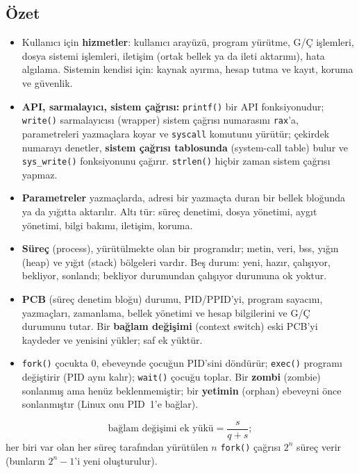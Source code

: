 \documentclass[11pt,a4paper]{article}
\newcommand{\term}[1]{\textbf{\color{mintdeep}#1}}
\newcommand{\cmd}[1]{\texttt{#1}}
\begin{document}
\subsection*{Özet}
\begin{itemize}
  \item Kullanıcı için \textbf{hizmetler}: kullanıcı arayüzü, program yürütme, G/Ç işlemleri, dosya sistemi işlemleri, iletişim (ortak bellek ya da ileti aktarımı), hata algılama. Sistemin kendisi için: kaynak ayırma, hesap tutma ve kayıt, koruma ve güvenlik.
  \item \textbf{API, sarmalayıcı, sistem çağrısı:} \cmd{printf()} bir API fonksiyonudur; \cmd{write()} sarmalayıcısı (wrapper) sistem çağrısı numarasını \texttt{rax}'a, parametreleri yazmaçlara koyar ve \texttt{syscall} komutunu yürütür; çekirdek numarayı denetler, \term{sistem çağrısı tablosunda} (system-call table) bulur ve \cmd{sys\_write()} fonksiyonunu çağırır. \cmd{strlen()} hiçbir zaman sistem çağrısı yapmaz.
  \item \textbf{Parametreler} yazmaçlarda, adresi bir yazmaçta duran bir bellek bloğunda ya da yığıtta aktarılır. Altı tür: süreç denetimi, dosya yönetimi, aygıt yönetimi, bilgi bakımı, iletişim, koruma.
  \item \term{Süreç} (process), yürütülmekte olan bir programdır; metin, veri, bss, yığın (heap) ve yığıt (stack) bölgeleri vardır. Beş durum: yeni, hazır, çalışıyor, bekliyor, sonlandı; bekliyor durumundan çalışıyor durumuna ok yoktur.
  \item \term{PCB} (süreç denetim bloğu) durumu, PID/PPID'yi, program sayacını, yazmaçları, zamanlama, bellek yönetimi ve hesap bilgilerini ve G/Ç durumunu tutar. Bir \term{bağlam değişimi} (context switch) eski PCB'yi kaydeder ve yenisini yükler; saf ek yüktür.
  \item \cmd{fork()} çocukta $0$, ebeveynde çocuğun PID'sini döndürür; \cmd{exec()} programı değiştirir (PID aynı kalır); \cmd{wait()} çocuğu toplar. Bir \term{zombi} (zombie) sonlanmış ama henüz beklenmemiştir; bir \term{yetimin} (orphan) ebeveyni önce sonlanmıştır (Linux onu PID~1'e bağlar).
\end{itemize}

\begin{keyidea}
\[
\text{bağlam değişimi ek yükü} = \frac{s}{q+s};
\]
her biri var olan her süreç tarafından yürütülen $n$ \cmd{fork()} çağrısı $2^{n}$ süreç verir (bunların $2^{n}-1$'i yeni oluşturulur).
\end{keyidea}
\end{document}
